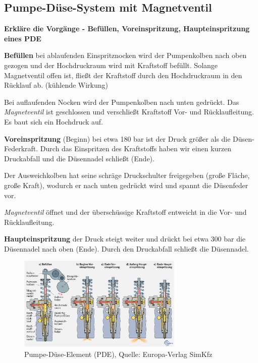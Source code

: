 \newpage

\subsection{Pumpe-Düse-System mit
Magnetventil}\label{pumpe-duese-system-mit-magnetventil}

\textbf{Erkläre die Vorgänge - Befüllen, Voreinspritzung,
Haupteinspritzung eines PDE}

\textbf{Befüllen} bei ablaufenden Einspritznocken wird der Pumpenkolben
nach oben gezogen und der Hochdruckraum wird mit Kraftstoff befüllt.
Solange Magnetventil offen ist, fließt der Kraftstoff durch den
Hochdruckraum in den Rücklauf ab. (kühlende Wirkung)

Bei auflaufenden Nocken wird der Pumpenkolben nach unten gedrückt. Das
\emph{Magnetventil} ist geschlossen und verschließt Kraftstoff Vor- und
Rücklaufleitung. Es baut sich ein Hochdruck auf.

\textbf{Voreinspritzung} (Beginn) bei etwa 180 bar ist der Druck größer
als die Düsen-Federkraft. Durch das Einspritzen des Kraftstoffs haben
wir einen kurzen Druckabfall und die Düsennadel schließt (Ende).

Der Ausweichkolben hat seine schräge Druckschulter freigegeben (große
Fläche, große Kraft), wodurch er nach unten gedrückt wird und spannt die
Düsenfeder vor.

\emph{Magnetventil} öffnet und der überschüssige Kraftstoff entweicht in
die Vor- und Rücklaufleitung.

\textbf{Haupteinspritzung} der Druck steigt weiter und drückt bei etwa
300 bar die Düsennadel nach oben (Ende). Durch den Druckabfall schließt
die Düsennadel.

\begin{figure}[!ht]%
\centering
\includegraphics[width=0.7\textwidth]{images/CR/Pumpe-Duese-Elements.png}
\caption{Pumpe-Düse-Element (PDE), Quelle: Europa-Verlag SimKfz}
\end{figure}

